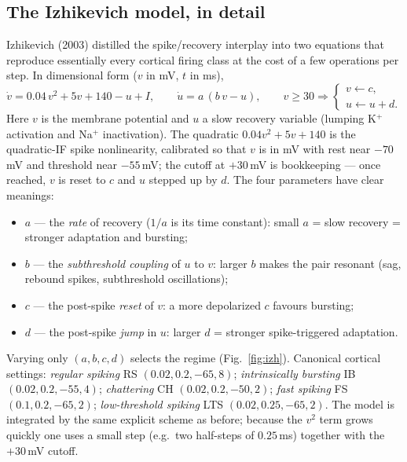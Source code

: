 \documentclass[11pt]{article}
\begin{document}
\subsection{The Izhikevich model, in detail}\label{sec:izh}
Izhikevich (2003) distilled the spike/recovery interplay into two equations that reproduce
essentially every cortical firing class at the cost of a few operations per step. In dimensional
form ($v$ in mV, $t$ in ms),
\begin{equation}
  \dot v=0.04\,v^2+5v+140-u+I,\qquad
  \dot u=a\,(b\,v-u),\qquad
  v\ge30\Rightarrow\begin{cases}v\leftarrow c,\\ u\leftarrow u+d.\end{cases}
  \label{eq:izh}
\end{equation}
Here $v$ is the membrane potential and $u$ a slow recovery variable (lumping K$^+$ activation and
Na$^+$ inactivation). The quadratic $0.04v^2+5v+140$ is the quadratic-IF spike nonlinearity,
calibrated so that $v$ is in mV with rest near $-70$\,mV and threshold near $-55$\,mV; the cutoff at
$+30$\,mV is bookkeeping --- once reached, $v$ is reset to $c$ and $u$ stepped up by $d$. The four
parameters have clear meanings:
\begin{itemize}[leftmargin=1.5em]
  \item $a$ --- the \emph{rate} of recovery ($1/a$ is its time constant): small $a$ = slow recovery = stronger adaptation and bursting;
  \item $b$ --- the \emph{subthreshold coupling} of $u$ to $v$: larger $b$ makes the pair resonant (sag, rebound spikes, subthreshold oscillations);
  \item $c$ --- the post-spike \emph{reset} of $v$: a more depolarized $c$ favours bursting;
  \item $d$ --- the post-spike \emph{jump} in $u$: larger $d$ = stronger spike-triggered adaptation.
\end{itemize}
Varying only $(a,b,c,d)$ selects the regime (Fig.~\ref{fig:izh}). Canonical cortical settings:
\emph{regular spiking} RS $(0.02,0.2,-65,8)$; \emph{intrinsically bursting} IB $(0.02,0.2,-55,4)$;
\emph{chattering} CH $(0.02,0.2,-50,2)$; \emph{fast spiking} FS $(0.1,0.2,-65,2)$;
\emph{low-threshold spiking} LTS $(0.02,0.25,-65,2)$. The model is integrated by the same explicit
scheme as before; because the $v^2$ term grows quickly one uses a small step (e.g.\ two half-steps
of $0.25$\,ms) together with the $+30$\,mV cutoff.
\end{document}
